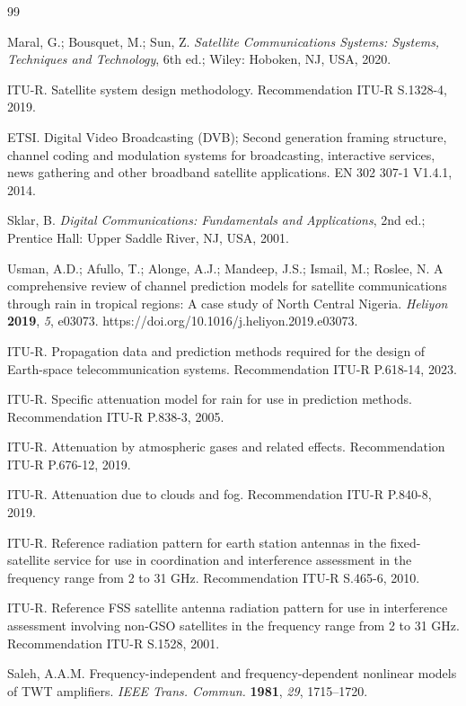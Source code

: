 \documentclass[telecom,article,submit,pdftex,moreauthors]{Definitions/mdpi}
\begin{document}
\begin{thebibliography}{99}

Maral, G.; Bousquet, M.; Sun, Z. \textit{Satellite Communications Systems: Systems, Techniques and Technology}, 6th ed.; Wiley: Hoboken, NJ, USA, 2020.

ITU-R. Satellite system design methodology. Recommendation ITU-R S.1328-4, 2019.

ETSI. Digital Video Broadcasting (DVB); Second generation framing structure, channel coding and modulation systems for broadcasting, interactive services, news gathering and other broadband satellite applications. EN 302 307-1 V1.4.1, 2014.

Sklar, B. \textit{Digital Communications: Fundamentals and Applications}, 2nd ed.; Prentice Hall: Upper Saddle River, NJ, USA, 2001.

Usman, A.D.; Afullo, T.; Alonge, A.J.; Mandeep, J.S.; Ismail, M.; Roslee, N. A comprehensive review of channel prediction models for satellite communications through rain in tropical regions: A case study of North Central Nigeria. \textit{Heliyon} \textbf{2019}, \textit{5}, e03073. https://doi.org/10.1016/j.heliyon.2019.e03073.

ITU-R. Propagation data and prediction methods required for the design of Earth-space telecommunication systems. Recommendation ITU-R P.618-14, 2023.

ITU-R. Specific attenuation model for rain for use in prediction methods. Recommendation ITU-R P.838-3, 2005.

ITU-R. Attenuation by atmospheric gases and related effects. Recommendation ITU-R P.676-12, 2019.

ITU-R. Attenuation due to clouds and fog. Recommendation ITU-R P.840-8, 2019.

ITU-R. Reference radiation pattern for earth station antennas in the fixed-satellite service for use in coordination and interference assessment in the frequency range from 2 to 31 GHz. Recommendation ITU-R S.465-6, 2010.

ITU-R. Reference FSS satellite antenna radiation pattern for use in interference assessment involving non-GSO satellites in the frequency range from 2 to 31 GHz. Recommendation ITU-R S.1528, 2001.

Saleh, A.A.M. Frequency-independent and frequency-dependent nonlinear models of TWT amplifiers. \textit{IEEE Trans. Commun.} \textbf{1981}, \textit{29}, 1715--1720.


\end{thebibliography}
\end{document}
